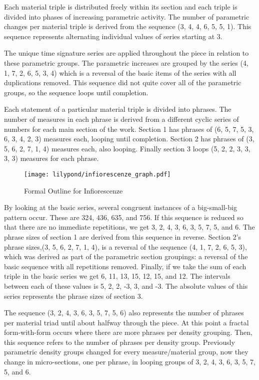 Each material triple is distributed freely within its section and each triple is divided into phases of increasing parametric activity. The number of parametric changes per material triple is derived from the sequence (3, 4, 4, 6, 5, 5, 1). This sequence represents alternating individual values of series starting at 3.

The unique time signature series are applied throughout the piece in relation to these parametric groups. The parametric increases are grouped by the series (4, 1, 7, 2, 6, 5, 3, 4) which is a reversal of the basic items of the series with all duplications removed. This sequence did not quite cover all of the parametric groups, so the sequence loops until completion.

Each statement of a particular material triple is divided into phrases. The number of measures in each phrase is derived from a different cyclic series of numbers for each main section of the work. Section 1 has phrases of (6, 5, 7, 5, 3, 6, 3, 4, 2, 3) measures each, looping until completion. Section 2 has phrases of (3, 5, 6, 2, 7, 1, 4) measures each, also looping. Finally section 3 loops (5, 2, 2, 3, 3, 3, 3) measures for each phrase.

\begin{figure}[p] %
    \centering
    \texttt{[image: lilypond/infiorescenze\_graph.pdf]}
    \caption{Formal Outline for Infiorescenze}
    \label{fig:inf-form}
\end{figure}

By looking at the basic series, several congruent instances of a big-small-big pattern occur. These are 324, 436, 635, and 756. If this sequence is reduced so that there are no immediate repetitions, we get 3, 2, 4, 3, 6, 3, 5, 7, 5, and 6. The phrase sizes of section 1 are derived from this sequence in reverse. Section 2's phrase sizes,(3, 5, 6, 2, 7, 1, 4), is a reversal of the sequence (4, 1, 7, 2, 6, 5, 3), which was derived as part of the parametric section groupings: a reversal of the basic sequence with all repetitions removed. Finally, if we take the sum of each triple in the basic series we get 6, 11, 13, 15, 12, 15, and 12. The intervals between each of these values is 5, 2, 2, -3, 3, and -3. The absolute values of this series represents the phrase sizes of section 3.

The sequence (3, 2, 4, 3, 6, 3, 5, 7, 5, 6) also represents the number of phrases per material triad until about halfway through the piece. At this point a fractal form-with-form occurs where there are more phrases per density grouping. Then, this sequence refers to the number of phrases per density group. Previously parametric density groups changed for every measure/material group, now they change in micro-sections, one per phrase, in looping groups of 3, 2, 4, 3, 6, 3, 5, 7, 5, and 6.

